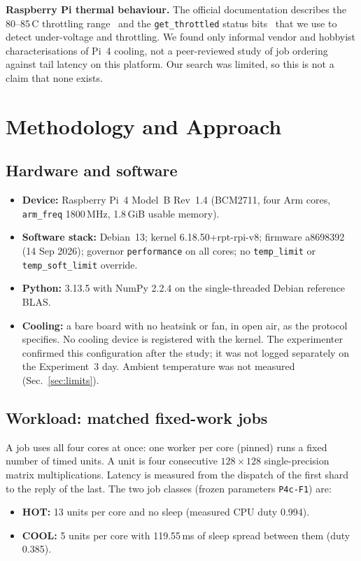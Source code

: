 \documentclass[conference,a4paper]{IEEEtran}
\newcommand{\degC}{\,\textdegree{}C}
\newcommand{\code}[1]{\texttt{#1}}
\begin{document}
\textbf{Raspberry Pi thermal behaviour.} The official documentation describes the 80--85\degC{} throttling
range~\cite{rpi-thermal} and the \code{get\_throttled} status bits~\cite{rpi-throttled} that we use to detect
under-voltage and throttling. We found only informal vendor and hobbyist characterisations of Pi~4 cooling, not a
peer-reviewed study of job ordering against tail latency on this platform. Our search was limited, so this is not
a claim that none exists.

\section{Methodology and Approach}
\subsection{Hardware and software}
\begin{itemize}
\item \textbf{Device:} Raspberry Pi~4 Model~B Rev~1.4 (BCM2711, four Arm cores, \code{arm\_freq} 1800\,MHz,
1.8\,GiB usable memory).
\item \textbf{Software stack:} Debian~13; kernel 6.18.50+rpt-rpi-v8; firmware a8698392 (14 Sep 2026); governor
\code{performance} on all cores; no \code{temp\_limit} or \code{temp\_soft\_limit} override.
\item \textbf{Python:} 3.13.5 with NumPy 2.2.4 on the single-threaded Debian reference BLAS.
\item \textbf{Cooling:} a bare board with no heatsink or fan, in open air, as the protocol specifies. No
cooling device is registered with the kernel. The experimenter confirmed this configuration after the study; it
was not logged separately on the Experiment~3 day. Ambient temperature was not measured (Sec.~\ref{sec:limits}).
\end{itemize}

\subsection{Workload: matched fixed-work jobs}
A job uses all four cores at once: one worker per core (pinned) runs a fixed number of timed units. A unit is four
consecutive $128\times128$ single-precision matrix multiplications. Latency is measured from the dispatch of the
first shard to the reply of the last. The two job classes (frozen parameters \code{P4c-F1}) are:
\begin{itemize}
\item \textbf{HOT:} 13 units per core and no sleep (measured CPU duty 0.994).
\item \textbf{COOL:} 5 units per core with 119.55\,ms of sleep spread between them (duty 0.385).
\end{itemize}
\end{document}
